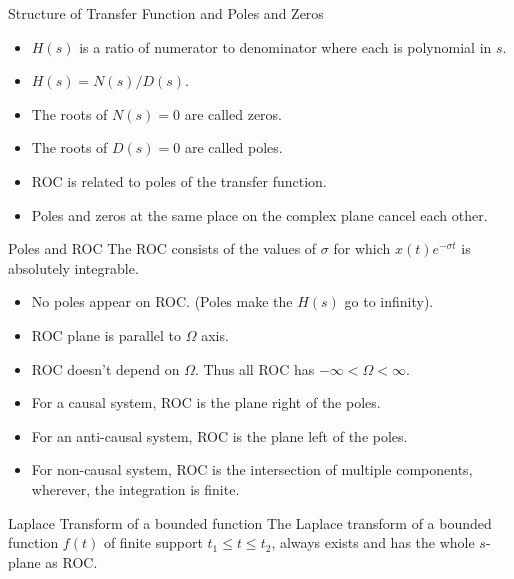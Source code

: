 \documentclass[aspectratio=169,xcolor=dvipsnames,svgnames,x11names,fleqn]{beamer}
\begin{document}
\begin{frame}{Structure of Transfer Function and Poles and Zeros}
\begin{itemize}
    \item $H(s)$ is a ratio of numerator to denominator where each is polynomial in $s$.
\item $H(s) = N(s)/D(s)$.
\item The roots of $N(s) = 0$ are called zeros.
\item The roots of $D(s) = 0$ are called poles.
\item ROC is related to poles of the transfer function.
\item Poles and zeros at the same place on the complex plane cancel each other.


\end{itemize}
    
\end{frame}

\begin{frame}{Poles and ROC}
    The ROC consists of the values of $\sigma$ for which $x(t)e^{-\sigma t}$ is absolutely integrable.
    \begin{itemize}
        \item No poles appear on ROC. (Poles make the $H(s)$ go to infinity).
        \item ROC plane is parallel to $\Omega$ axis.
        \item ROC doesn’t depend on $\Omega$. Thus all ROC has $-\infty < \Omega < \infty$.
\item For a causal system, ROC is the plane right of the poles.
\item For an anti-causal system, ROC is the plane left of the poles.
\item For non-causal system, ROC is the intersection of multiple components, wherever, the integration is finite.

    \end{itemize}
\end{frame}




\begin{frame}{Laplace Transform of a bounded function}
    The Laplace transform of a bounded function $f (t)$ of finite support $t_1 \leq t \leq t_2$, always exists and has the whole $s$-plane as ROC.

\end{frame}
\end{document}
